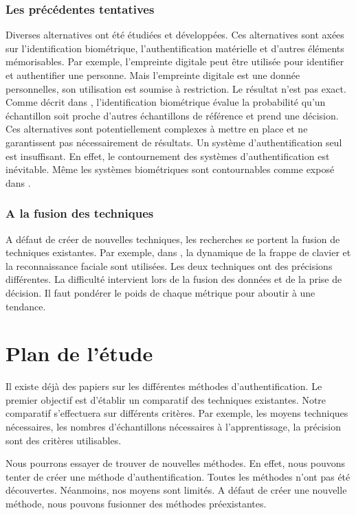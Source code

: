\documentclass[conference,compsoc]{IEEEtran}
\begin{document}
\subsubsection{Les précédentes tentatives}

Diverses alternatives ont été étudiées et développées. Ces alternatives sont axées sur l'identification biométrique, l'authentification matérielle et d'autres éléments mémorisables. Par exemple, l'empreinte digitale peut être utilisée pour identifier et authentifier une personne. Mais l'empreinte digitale est une donnée personnelles, son utilisation est soumise à restriction. Le résultat n'est pas exact. Comme décrit dans \cite{10.1109/MC.2012.364} , l'identification biométrique évalue la probabilité qu'un échantillon soit proche d'autres échantillons de référence et prend une décision. Ces alternatives sont potentiellement complexes à mettre en place et ne garantissent pas nécessairement de résultats. Un système d'authentification seul est insuffisant. En effet, le contournement des systèmes d'authentification est inévitable. Même les systèmes biométriques sont contournables comme exposé dans \cite{duc2009your}.

\subsubsection{A la fusion des techniques}

A défaut de créer de nouvelles techniques, les recherches se portent la fusion de techniques existantes. Par exemple, dans \cite{7371386}, la dynamique de la frappe de clavier et la reconnaissance faciale sont utilisées. Les deux techniques ont des précisions différentes. La difficulté intervient lors de la fusion des données et de la prise de décision. Il faut pondérer le poids de chaque métrique pour aboutir à une tendance.

\section{Plan de l'étude}

Il existe déjà des papiers sur les différentes méthodes d'authentification.
Le premier objectif est d'établir un comparatif des techniques existantes. Notre comparatif s'effectuera sur différents critères. Par exemple, les moyens techniques nécessaires, les nombres d'échantillons nécessaires à l'apprentissage, la précision sont des critères utilisables.



Nous pourrons essayer de trouver de nouvelles méthodes. En effet, nous pouvons tenter de créer une méthode d'authentification. Toutes les méthodes n'ont pas été découvertes. Néanmoins, nos moyens sont limités. A défaut de créer une nouvelle méthode, nous pouvons fusionner des méthodes préexistantes.
\end{document}
